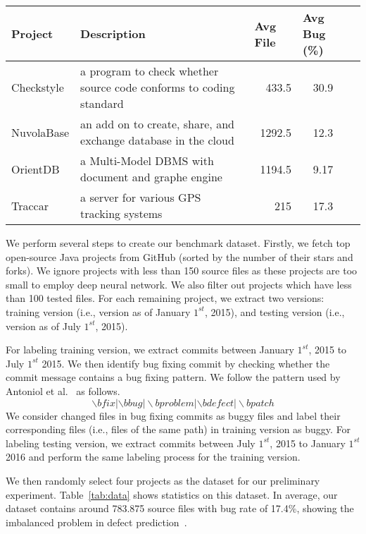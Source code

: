 \begin{table*}[t!]
	\centering
	\caption{Description of four popular software projects.}
	\begin{tabular}{|l|l|r|c|c|}
		\hline
		Project & \multicolumn{1}{l|}{Description}  & \multicolumn{1}{l|}{Avg File} & \multicolumn{1}{l|}{Avg Bug (\%)} \\
		\hline
		\hline
		Checkstyle  &  a program to check whether source code conforms to coding standard & 433.5 & 30.9 \\
		NuvolaBase &  an add on to create, share, and exchange database in the cloud     & 1292.5 & 12.3 \\
		OrientDB &  a Multi-Model DBMS with document and graphe engine  & 1194.5 & 9.17 \\
		Traccar &  a server for various GPS tracking systems & 215   & 17.3 \\
		\hline
	\end{tabular}%
	\label{tab:data}%
\end{table*}%

We perform several steps to create our benchmark dataset. Firstly, we fetch top open-source Java projects from GitHub (sorted by the number of their stars and forks). We ignore projects with less than 150 source files as these projects are too small to employ deep neural network. We also filter out projects which have less than 100 tested files. For each remaining project, we extract two versions: training version (i.e., version as of January $1^{st}$, 2015), and testing version (i.e., version as of July $1^{st}$, 2015). 

For labeling training version, we extract commits between January $1^{st}$, 2015 to July $1^{st}$ 2015. We then identify bug fixing commit by checking whether the commit message contains a bug fixing pattern. We follow the pattern used by Antoniol et al.~\cite{antoniol2008bug} as follows.
\[
\backslash bfix|\backslash bbug|\backslash bproblem|\backslash bdefect|\backslash bpatch
\]
We consider changed files in bug fixing commits as buggy files and label their corresponding files (i.e., files of the same path) in training version as buggy. For labeling testing version, we extract commits between July $1^{st}$, 2015 to January $1^{st}$ 2016 and perform the same labeling process for the training version.

We then randomly select four projects as the dataset for our preliminary experiment. Table~\ref{tab:data} shows statistics on this dataset. In average, our dataset contains around 783.875 source files with bug rate of 17.4\%, showing the imbalanced problem in defect prediction~\cite{wang2013using, khoshgoftaar2010attribute}.

